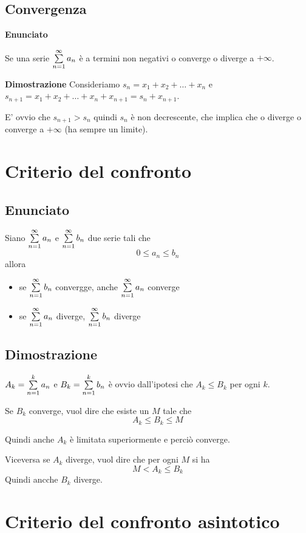 \subsection{Convergenza }

\textbf{Enunciato}

Se una serie $\sum\limits_{n=1}^{\infty}a_n$  è a termini non negativi o converge o diverge a $+\infty$.

\textbf{Dimostrazione}
Consideriamo $s_n = x_1 + x_2 + \ldots + x_n$ e $s_{n+1} = x_1 + x_2 + \ldots + x_n + x_{n+1} = s_n + x_{n+1}$. 

E' ovvio che $s_{n+1}>s_n$ quindi $s_n$ è non decrescente, che implica che o diverge o converge a $+\infty$ (ha sempre un limite).

\section{Criterio del confronto}

\subsection{Enunciato}
Siano $\sum\limits_{n=1}^{\infty}a_n$ e $\sum\limits_{n=1}^{\infty}b_n$ due serie tali che $$0 \leq a_n \leq b_n$$ allora

\begin{itemize}
\item se $\sum\limits_{n=1}^{\infty}b_n$ convergge, anche $\sum\limits_{n=1}^{\infty}a_n$ converge
\item se $\sum\limits_{n=1}^{\infty}a_n$ diverge, $\sum\limits_{n=1}^{\infty}b_n$ diverge
\end{itemize}

\subsection{Dimostrazione}
$A_k = \sum\limits_{n=1}^{k}a_n$ e $B_k = \sum\limits_{n=1}^{k}b_n$ è ovvio dall'ipotesi che $A_k \leq B_k$ per ogni $k$. 

Se $B_k$ converge, vuol dire che esiste un $M$ tale che $$A_k \leq B_k \leq M$$

Quindi anche $A_k$ è limitata superiormente e perciò converge. 

Viceversa se $A_k$ diverge, vuol dire che per ogni $M$ si ha $$M < A_k \leq B_k$$ Quindi ancche $B_k$ diverge.

\section{Criterio del confronto asintotico}

